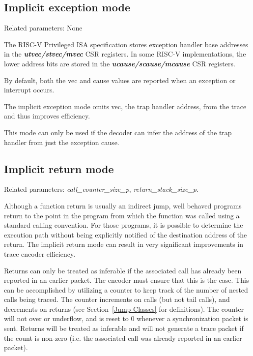 \subsection{Implicit exception mode} \label{sec:implicit-exception}

Related parameters: None

The RISC-V Privileged ISA specification stores exception handler base
addresses in the \textbf{\textit{utvec/stvec/mvec}} CSR registers.
In some RISC-V implementations, the lower address bits are stored in
the \textbf{\textit{ucause/scause/mcause}} CSR registers.

By default, both the vec and cause values are reported when an exception or interrupt occurs.

The implicit exception mode omits vec, the trap handler address, from the trace and
thus improves efficiency.

This mode can only be used if the decoder can infer the address of the trap handler
from just the exception cause.

\subsection{Implicit return mode} \label{sec:implicit-return}

Related parameters: \textit{call\_counter\_size\_p}, \textit{return\_stack\_size\_p}.

Although a function return is usually an indirect jump, well behaved programs return to the
point in the program from which the function was called using a standard calling convention.
For those programs, it is possible to determine the execution path without being explicitly notified
of the destination address of the return.  The implicit return mode can result in very
significant improvements in trace encoder efficiency.

Returns can only be treated as inferable if the associated call has already been reported in
an earlier packet.  The encoder must ensure that this is the case.  This can be accomplished
by utilizing a counter to keep track of the number of nested calls being traced.  The counter
increments on calls (but not tail calls), and decrements on returns (see Section~\ref{Jump Classes}
for definitions).  The counter will not over or underflow, and is reset to 0 whenever a
synchronization packet is sent.  Returns will be treated as inferable and will not generate a trace
packet if the count is non-zero (i.e. the associated call was already reported in an earlier packet).

